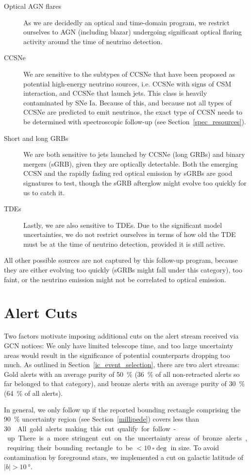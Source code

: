 \begin{description}
    \item[Optical AGN flares] As we are decidedly an optical and time-domain program, we restrict ourselves to AGN (including blazar) undergoing significant optical flaring activity around the time of neutrino detection.
    \item[CCSNe] We are sensitive to the subtypes of CCSNe that have been proposed as potential high-energy neutrino sources, i.e. CCSNe with signs of CSM interaction, and CCSNe that launch jets. This class is heavily contaminated by SNe Ia. Because of this, and because not all types of CCSNe are predicted to emit neutrinos, the exact type of CCSN needs to be determined with spectroscopic follow-up (see Section~\ref{spec_resources}).
    \item[Short and long GRBs] We are both sensitive to jets launched by CCSNe (long GRBs) and binary mergers (sGRB), given they are optically detectable. Both the emerging CCSN and the rapidly fading red optical emission by sGRBs are good signatures to test, though the sGRB afterglow might evolve too quickly for us to catch it.
    \item[TDEs] Lastly, we are also sensitive to TDEs. Due to the significant model uncertainties, we do not restrict ourselves in terms of how old the TDE must be at the time of neutrino detection, provided it is still active.
\end{description}
All other possible sources are not captured by this follow-up program, because they are either evolving too quickly (sGRBs might fall under this category), too faint, or the neutrino emission might not be correlated to optical emission.

\section{Alert Cuts}\label{alert_cuts}
Two factors motivate imposing additional cuts on the alert stream received via GCN notices: We only have limited telescope time, and too large uncertainty areas would result in the significance of potential counterparts dropping too much. As outlined in Section~\ref{ic_event_selection}, there are two alert streams: Gold alerts with an average purity of \SI{50}{\percent} (\SI{36}{\percent} of all non-retracted alerts so far belonged to that category), and bronze alerts with an average purity of \SI{30}{\percent} (\SI{64}{\percent} of all alerts).

In general, we only follow up if the reported bounding rectangle comprising the \SI{90}{\percent} uncertainty region (see Section~\ref{millipede}) covers less than \SI{30}{\square\deg}. All gold alerts making this cut qualify for follow-up. There is a more stringent cut on the uncertainty areas of bronze alerts, requiring their bounding rectangle to be $<\SI{10}{\square\deg}$ in size. To avoid contamination by foreground stars, we implemented a cut on galactic latitude of $|b|>\SI{10}{\degree}$.

